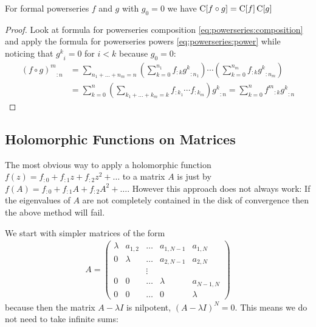 \documentclass{article}
\numberwithin{equation}{section}
\begin{document}
\begin{wellknown}
  For formal powerseries $f$ and $g$ with $g_0=0$ we have 
  $\operatorname{C}[f\circ g]=\operatorname{C}[f]\operatorname{C}[g]$
\end{wellknown}
\begin{proof}
  Look at formula for powerseries composition
  \eqref{eq:powerseries:composition} and apply the formula for
  powerseries powers \eqref{eq:powerseries:power} while noticing that
  ${g^k}_i=0$ for $i<k$ because $g_0=0$: 
  \begin{align*}
    {(f\circ g)^m}_{:n} &= \sum_{n_1+\dots+n_m=n} \left(\sum_{k=0}^{n_1}
      {f}_{:k} {g^k}_{:n_1} \right)\dotsm \left(\sum_{k=0}^{n_m} {f}_{:k}
      {g^k}_{:n_m}\right)\\
      &= \sum_{k=0}^n \left(\sum_{k_1+\dots+k_m=k} f_{:k_1}\dotsm
        f_{:k_m}\right) {g^k}_{:n} = \sum_{k=0}^n {f^m}_{:k} {g^k}_{:n}
  \end{align*}
\end{proof}


\subsection{Holomorphic Functions on Matrices}
The most obvious way to apply a holomorphic function $f(z)=f_{:0} +
f_{:1} z + f_{:2} z^2 + \dots$ to a matrix $A$ is just by $f(A)=f_{:0} + f_{:1} A
+ f_{:2} A^2 + \dots$. However this approach does not always work: If the
eigenvalues of $A$ are not completely contained in the disk of
convergence then the above method will fail.

We start with simpler matrices of the form
\begin{align}\label{eq:matrix:simple}
  A = \begin{pmatrix}
    \lambda & a_{1,2} &\dots & a_{1,N-1} &a_{1,N}\\
    0 & \lambda & \dots & a_{2,N-1} & a_{2,N}\\
     &  & \vdots &\\
    0 & 0 & \dots & \lambda & a_{N-1,N} \\
    0 & 0 & \dots & 0 &\lambda
  \end{pmatrix}
\end{align}
because then the matrix $A-\lambda I$ is nilpotent, $(A-\lambda
I)^N= 0$. This means we do not need to take infinite sums:
\end{document}
